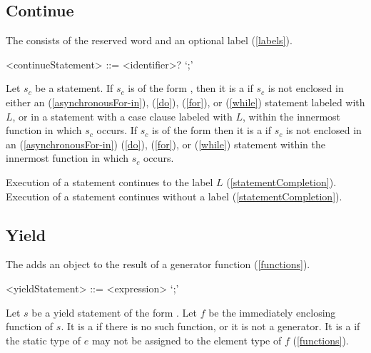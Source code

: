 \documentclass[makeidx]{article}
\begin{document}
{\subsection{Continue}

\LMHash{}%
The  consists of the reserved word \CONTINUE{}
and an optional label (\ref{labels}).

\begin{grammar}
<continueStatement> ::= \CONTINUE{} <identifier>? `;'
\end{grammar}

\LMHash{}%
Let $s_c$ be a \CONTINUE{} statement.
If $s_c$ is of the form ,
then it is a  if $s_c$ is not enclosed in either an
\code{\AWAIT{} \FOR} (\ref{asynchronousFor-in}),
\DO{} (\ref{do}), \FOR{} (\ref{for}), or \WHILE{} (\ref{while})
statement labeled with $L$, or in a \SWITCH{} statement with a case clause
labeled with $L$, within the innermost function in which $s_c$ occurs.
If $s_c$ is of the form \code{\CONTINUE;}
then it is a  if $s_c$ is not enclosed in an
\code{\AWAIT{} \FOR} (\ref{asynchronousFor-in})
\DO{} (\ref{do}), \FOR{} (\ref{for}), or \WHILE{} (\ref{while}) statement
within the innermost function in which $s_c$ occurs.

\LMHash{}%
Execution of a \CONTINUE{} statement  continues
to the label $L$ (\ref{statementCompletion}).
Execution of a \CONTINUE{} statement \code{\CONTINUE;} continues
without a label (\ref{statementCompletion}).


\subsection{Yield}

\LMHash{}%
The  adds an object to
the result of a generator function
(\ref{functions}).

\begin{grammar}
<yieldStatement> ::= \YIELD{} <expression> `;'
\end{grammar}

\LMHash{}%
Let $s$ be a yield statement of the form .
Let $f$ be the immediately enclosing function of $s$.
It is a  if there is no such function,
or it is not a generator.
It is a  if the static type of $e$
may not be assigned to the element type of $f$
(\ref{functions}).

}
\end{document}
